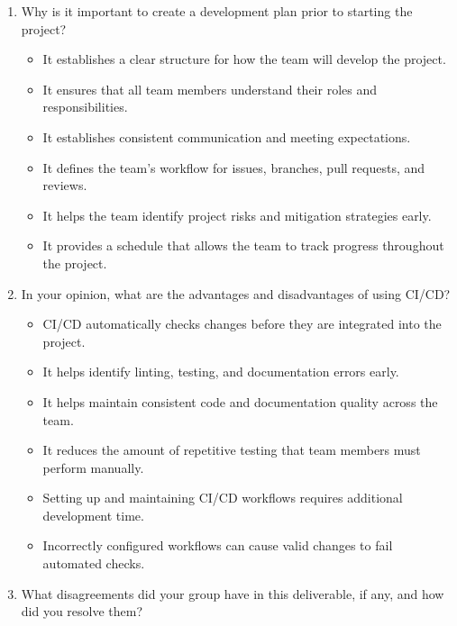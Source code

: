 \documentclass{article}
\begin{document}
\begin{enumerate}

    \item Why is it important to create a development plan prior to starting the
    project?

    \begin{itemize}
        \item It establishes a clear structure for how the team will develop the project.
        \item It ensures that all team members understand their roles and responsibilities.
        \item It establishes consistent communication and meeting expectations.
        \item It defines the team's workflow for issues, branches, pull requests, and reviews.
        \item It helps the team identify project risks and mitigation strategies early.
        \item It provides a schedule that allows the team to track progress throughout the project.
    \end{itemize}

    \item In your opinion, what are the advantages and disadvantages of using
    CI/CD?

    \begin{itemize}
        \item CI/CD automatically checks changes before they are integrated into the project.
        \item It helps identify linting, testing, and documentation errors early.
        \item It helps maintain consistent code and documentation quality across the team.
        \item It reduces the amount of repetitive testing that team members must perform manually.
        \item Setting up and maintaining CI/CD workflows requires additional development time.
        \item Incorrectly configured workflows can cause valid changes to fail automated checks.
    \end{itemize}

    \item What disagreements did your group have in this deliverable, if any,
    and how did you resolve them?


\end{enumerate}
\end{document}
